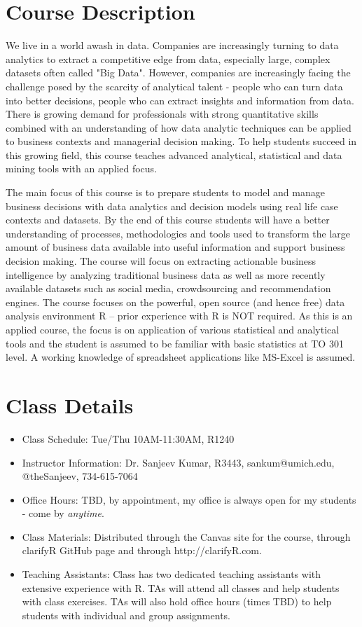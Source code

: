 \documentclass[10pt, letterpaper, twoside]{memoir}\usepackage{knitr}
\begin{document}
\vspace{12pt}


\section{Course Description}

We live in a world awash in data. Companies are increasingly turning to data analytics to extract a competitive edge from data, especially large, complex datasets often called "Big Data". However, companies are increasingly facing the challenge posed by the scarcity of analytical talent - people who can turn data into better decisions, people who can extract insights and information from data. There is growing demand for professionals with strong quantitative skills combined with an understanding of how data analytic techniques can be applied to business contexts and managerial decision making. To help students succeed in this growing field, this course teaches advanced analytical, statistical and data mining tools with an applied focus. 

The main focus of this course is to prepare students to model and manage business decisions with data analytics and decision models using real life case contexts and datasets.  By the end of this course students will have a better understanding of processes, methodologies and tools used to transform the large amount of business data available into useful information and support business decision making. The course will focus on extracting actionable business intelligence by analyzing traditional business data as well as more recently available datasets such as social media, crowdsourcing and recommendation engines. The course focuses on the powerful, open source (and hence free) data analysis environment R – prior experience with R is NOT required. As this is an applied course, the focus is on application of various statistical and analytical tools and the student is assumed to be familiar with basic statistics at TO 301 level. A working knowledge of spreadsheet applications like MS-Excel is assumed.


\section{Class Details}
\begin{itemize}
\item Class Schedule: Tue/Thu 10AM-11:30AM, R1240
\item Instructor Information: Dr. Sanjeev Kumar, R3443, sankum@umich.edu, @theSanjeev, 734-615-7064
\item Office Hours: TBD, by appointment, my office is always open for my students - come by \emph{anytime}.
\item Class Materials: Distributed through the Canvas site for the course, through clarifyR GitHub page and through http://clarifyR.com.
\item Teaching Assistants: Class has two dedicated teaching assistants with extensive experience with R. TAs will attend all classes and help students with class exercises. TAs will also hold office hours (times TBD) to help students with individual and group assignments.
\end{itemize}
\end{document}

